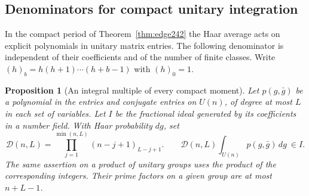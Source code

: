 \documentclass[a4paper,11pt]{article}
\newtheorem{proposition}{Proposition}[section]
\theoremstyle{definition}
\theoremstyle{remark}
\numberwithin{equation}{section}
\begin{document}
\subsection{Denominators for compact unitary integration}\label{nav:VI-33}
In the compact period of Theorem~\ref{thm:edge242} the Haar
average acts on explicit polynomials in unitary matrix entries.
The following denominator is independent of their coefficients and
of the number of finite classes. Write \((h)_b=h(h+1)\cdots(h+b-1)\)
with \((h)_0=1\).

\begin{proposition}[An integral multiple of every compact moment]
\label{prop:moments242}
Let \(p(g,\bar g)\) be a polynomial in the entries and conjugate
entries on \(U(n)\), of degree at most \(L\) in each set of
variables. Let \(I\) be the fractional ideal generated by its
coefficients in a number field. With Haar probability \(dg\), set
\[
 \mathcal D(n,L)=\prod_{j=1}^{\min(n,L)}(n-j+1)_{L-j+1}.
 \qquad
 \mathcal D(n,L)\int_{U(n)}p(g,\bar g)\,dg\ \in I .
\]
The same assertion on a product of unitary groups uses the product
of the corresponding integers. Their prime factors on a given group
are at most \(n+L-1\).
\end{proposition}
\end{document}
